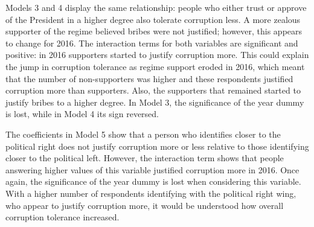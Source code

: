 \documentclass[12pt,a4]{article}\usepackage[]{graphicx}\usepackage[]{xcolor}
\begin{document}
Models 3 and 4 display the same relationship: people who either trust or approve of the President in a higher degree also tolerate corruption less. A more zealous supporter of the regime believed bribes were not justified; however, this appears to change for 2016. The interaction terms for both variables are significant and positive: in 2016 supporters started to justify corruption more. This could explain the jump in corruption tolerance as regime support eroded in 2016, which meant that the number of non-supporters was higher and these respondents justified corruption more than supporters. Also, the supporters that remained started to justify bribes to a higher degree. In Model 3, the significance of the year dummy is lost, while in Model 4 its sign reversed.

The coefficients in Model 5 show that a person who identifies closer to the political right does not justify corruption more or less relative to those identifying closer to the political left. However, the interaction term shows that people answering higher values of this variable justified corruption more in 2016. Once again, the significance of the year dummy is lost when considering this variable. With a higher number of respondents identifying with the political right wing, who appear to justify corruption more, it would be understood how overall corruption tolerance increased.


\end{document}
